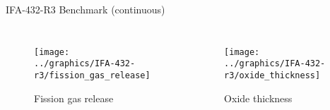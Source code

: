 \documentclass[11pt]{beamer}
\begin{document}
\begin{frame}{IFA-432-R3 Benchmark (continuous)}
  \footnotesize 
  
  \begin{columns}[t]


  \begin{figure}[h]
    \texttt{[image: ../graphics/IFA-432-r3/fission\_gas\_release]}
    \caption{Fission gas release}
  \end{figure}  


  \begin{figure}[h]
    \texttt{[image: ../graphics/IFA-432-r3/oxide\_thickness]}    
    \caption{Oxide thickness}
  \end{figure}  
  
  \end{columns}

\end{frame}
\end{document}
